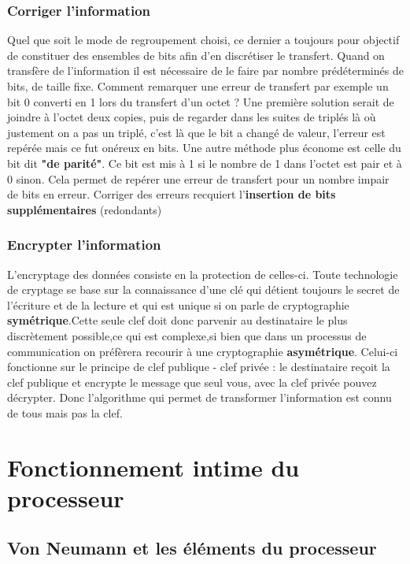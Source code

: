 \documentclass{report}
\begin{document}
\subsection{Corriger l'information}

Quel que soit le mode de regroupement choisi, ce dernier a toujours pour objectif de constituer des ensembles de bits afin d'en discrétiser le transfert. Quand on transfère de l'information il est nécessaire de le faire par nombre prédéterminés de bits, de taille fixe. Comment remarquer une erreur de transfert par exemple un bit 0 converti en 1 lors du transfert d'un octet ? Une première solution serait de joindre à l'octet deux copies, puis de regarder dans les suites de triplés là où justement on a pas un triplé, c'est là que le bit a changé de valeur, l'erreur est repérée mais ce fut onéreux en bits. Une autre méthode plus économe est celle du bit dit {\bf "de parité"}. Ce bit est mis à 1 si le nombre de 1 dans l'octet est pair et à 0 sinon. Cela permet de repérer une erreur de transfert pour un nombre impair de bits en erreur. 
Corriger des erreurs recquiert l'{\bf insertion de bits supplémentaires} (redondants)\\

\subsection{Encrypter l'information}
L'encryptage des données consiste en la protection de celles-ci. Toute technologie de cryptage se base sur la connaissance d'une clé qui détient toujours le secret de l'écriture et de la lecture et qui est unique si on parle de cryptographie {\bf symétrique}.Cette seule clef doit donc parvenir au destinataire le plus discrètement possible,ce qui est complexe,si bien que dans un processus de communication on préfèrera recourir à une cryptographie {\bf asymétrique}. Celui-ci fonctionne sur le principe de clef publique - clef privée : le destinataire reçoit la clef publique et encrypte le message que seul vous, avec la clef privée pouvez décrypter.
Donc l'algorithme qui permet de transformer l'information est connu de tous mais pas la clef.


\chapter{Fonctionnement intime du processeur}

\section{Von Neumann et les éléments du processeur}
\end{document}
